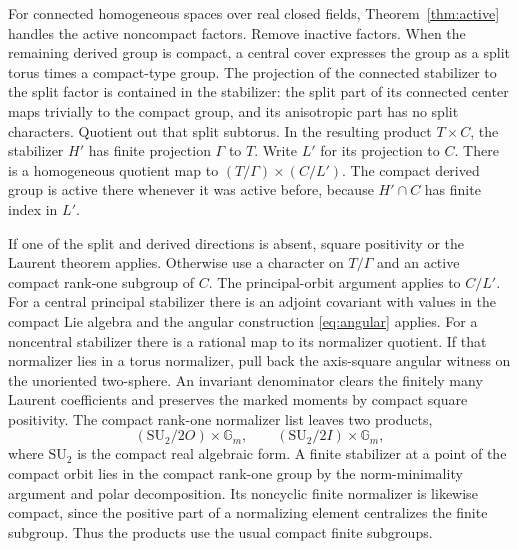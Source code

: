 \documentclass[11pt]{article}
\newcommand{\Gm}{\mathbb G_m}
\newcommand{\SU}{\mathrm{SU}}
\begin{document}
For connected homogeneous spaces over real closed fields,
Theorem~\ref{thm:active} handles the active noncompact factors.
Remove inactive factors. When the remaining derived group is
compact, a central cover expresses the group as a split torus
times a compact-type group. The projection of the connected
stabilizer to the split factor is contained in the stabilizer:
the split part of its connected center maps trivially to the
compact group, and its anisotropic part has no split characters.
Quotient out that split subtorus. In the resulting product
\(T\times C\), the stabilizer \(H'\) has finite projection
\(\Gamma\) to \(T\). Write \(L'\) for its projection to \(C\).
There is a homogeneous quotient map to
\((T/\Gamma)\times(C/L')\). The compact derived group is active
there whenever it was active before, because \(H'\cap C\) has
finite index in \(L'\).

If one of the split and derived directions is absent, square
positivity or the Laurent theorem applies. Otherwise use a
character on \(T/\Gamma\) and an active compact rank-one subgroup
of \(C\). The principal-orbit argument applies to \(C/L'\).
For a central principal stabilizer there is an adjoint covariant
with values in the compact Lie algebra and the angular construction
\eqref{eq:angular} applies. For a noncentral stabilizer there is
a rational map to its normalizer quotient. If that normalizer
lies in a torus normalizer, pull back the axis-square angular
witness on the unoriented two-sphere. An invariant denominator
clears the finitely many Laurent coefficients and preserves the
marked moments by compact square positivity. The compact
rank-one normalizer list leaves two products,
\[
                 (\SU_2/2O)\times\Gm,\qquad
                 (\SU_2/2I)\times\Gm ,
\]
where \(\SU_2\) is the compact real algebraic form. A finite
stabilizer at a point of the compact orbit lies in the compact
rank-one group by the norm-minimality argument and polar decomposition.
Its noncyclic finite normalizer is likewise compact, since the
positive part of a normalizing element centralizes the finite
subgroup. Thus the products use the usual compact finite subgroups.
\end{document}
